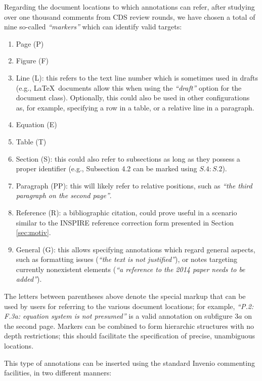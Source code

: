 Regarding the document locations to which annotations can refer, after studying
over one thousand comments from CDS review rounds, we have chosen a total of
nine so-called \textit{``markers''} which can identify valid targets:
\begin{enumerate}
  \item Page (P)
  \item Figure (F)
  \item Line (L): this refers to the text line number which is sometimes used
                  in drafts (e.g., \LaTeX\ documents allow this when using the
                  \textit{``draft''} option for the document class). Optionally,
                  this could also be used in other configurations as, for
                  example, specifying a row in a table, or a relative line in a
                  paragraph.
  \item Equation (E)
  \item Table (T)
  \item Section (S): this could also refer to subsections as long as they
                     possess a proper identifier (e.g., Subsection 4.2 can be
                     marked using $S.4: S.2$).
  \item Paragraph (PP): this will likely refer to relative positions, such
                        as \textit{``the third paragraph on the second page''}.
  \item Reference (R): a bibliographic citation, could prove useful in a
                       scenario similar to the INSPIRE reference correction 
                       form presented in Section \ref{sec:motiv}.
  \item General (G): this allows specifying annotations which regard general
                     aspects, such as formatting issues (\textit{``the text is
                     not justified''}), or notes targeting currently nonexistent
                     elements (\textit{``a reference to the 2014 paper needs to
                     be added''}).
\end{enumerate}
The letters between parentheses above denote the special markup that can be
used by users for referring to the various document locations; for example,
\textit{``P.2: F.3a: equation system is not presumed''} is a valid annotation
on subfigure $3a$ on the second page. Markers can be combined to form
hierarchic structures with no depth restrictions; this should facilitate the
specification of precise, unambiguous locations.

This type of annotations can be inserted using the standard Invenio
commenting facilities, in two different manners:

